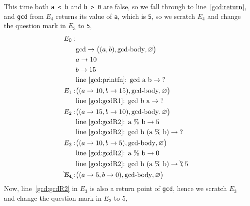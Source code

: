 This time both \lstinline!a < b! and \lstinline!b > 0! are false, so we fall through to line~\ref{gcd:return}, and \lstinline!gcd! from $E_4$ returns its value of \lstinline!a!, which is \lstinline!5!, so we scratch $E_4$ and change the question mark in $E_3$ to \lstinline!5!,
\begin{align*}
  E_0:&\\
      & \text{gcd} \rightarrow \big((a, b), \text{gcd-body}, \varnothing\big)\\
      & a \rightarrow 10\\
      & b \rightarrow 15\\
      & \text{line~\ref{gcd:printfn}: gcd a b} \rightarrow \text{?}\\
  E_1:& \big((a \rightarrow 10, b \rightarrow 15), \text{gcd-body}, \varnothing\big)\\
      & \text{line~\ref{gcd:gcdR1}: gcd b a} \rightarrow \text{?}\\
  E_2:& \big((a \rightarrow 15, b \rightarrow 10), \text{gcd-body}, \varnothing\big)\\
      & \text{line~\ref{gcd:gcdR2}: a \% b} \rightarrow 5\\
      & \text{line~\ref{gcd:gcdR2}: gcd b (a \% b)} \rightarrow \text{?}\\
  E_3:& \big((a \rightarrow 10, b \rightarrow 5), \text{gcd-body}, \varnothing\big)\\
      & \text{line~\ref{gcd:gcdR2}: a \% b} \rightarrow 0\\
      & \text{line~\ref{gcd:gcdR2}: gcd b (a \% b)} \rightarrow \bcancel{\text{?}}\; 5\\
  \bcancel{E_4}:& \big((a \rightarrow 5, b \rightarrow 0), \text{gcd-body}, \varnothing\big)\\
\end{align*}
Now, line~\ref{gcd:gcdR2} in $E_3$ is also a return point of \lstinline!gcd!, hence we scratch $E_3$ and change the question mark in $E_2$ to 5,
